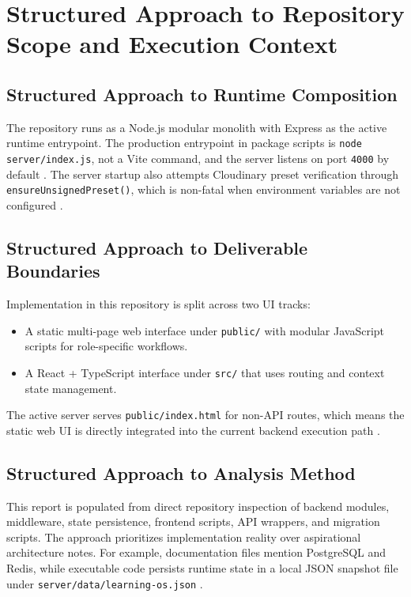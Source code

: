 \section{Structured Approach to Repository Scope and Execution Context}

\subsection{Structured Approach to Runtime Composition}

The repository runs as a Node.js modular monolith with Express as the active runtime entrypoint. The production entrypoint in package scripts is \texttt{node server/index.js}, not a Vite command, and the server listens on port \texttt{4000} by default \cite{repo-readme}. The server startup also attempts Cloudinary preset verification through \texttt{ensureUnsignedPreset()}, which is non-fatal when environment variables are not configured \cite{repo-server-app,repo-upload}.

\subsection{Structured Approach to Deliverable Boundaries}

Implementation in this repository is split across two UI tracks:
\begin{itemize}[leftmargin=1.5em]
  \item A static multi-page web interface under \texttt{public/} with modular JavaScript scripts for role-specific workflows.
  \item A React + TypeScript interface under \texttt{src/} that uses routing and context state management.
\end{itemize}

The active server serves \texttt{public/index.html} for non-API routes, which means the static web UI is directly integrated into the current backend execution path \cite{repo-server-app,repo-public-ui,repo-react-ui}.

\subsection{Structured Approach to Analysis Method}

This report is populated from direct repository inspection of backend modules, middleware, state persistence, frontend scripts, API wrappers, and migration scripts. The approach prioritizes implementation reality over aspirational architecture notes. For example, documentation files mention PostgreSQL and Redis, while executable code persists runtime state in a local JSON snapshot file under \texttt{server/data/learning-os.json} \cite{repo-store}.

